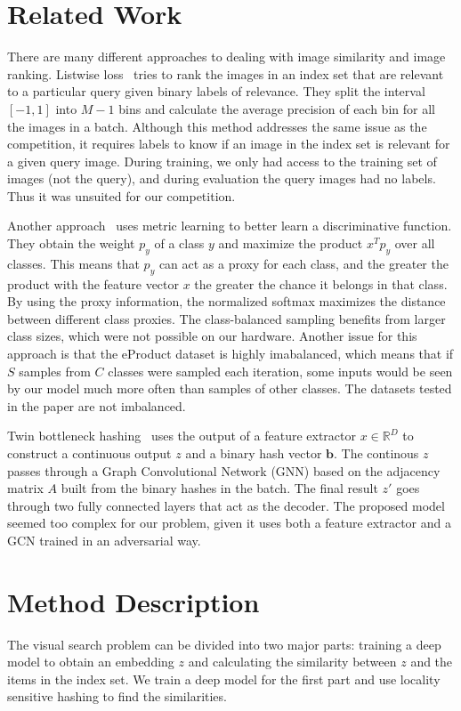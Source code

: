 \documentclass[conference]{IEEEtran}
\begin{document}
\section{Related Work}
There are many different approaches to dealing with image similarity and image 
ranking.
Listwise loss~\cite{revaud2019learning} tries to rank the images in an index set that are 
relevant to a particular query given binary labels of relevance. 
They split the interval $[-1, 1]$ into $M-1$ bins and calculate the average precision
of each bin for all the images in a batch.
Although this method addresses the same issue as the competition, it requires labels to know
if an image in the index set is relevant for a given query image.
During training, we only had access to the training set of images (not the query), and during 
evaluation the query images had no labels.
Thus it was unsuited for our competition.

Another approach~\cite{zhai2018classification} uses metric learning to better learn a discriminative 
function.
They obtain the weight $p_y$ of a class $y$ and maximize the product $x^T p_y$ over all classes.
This means that $p_y$ can act as a proxy for each class, and the greater the product with the feature
vector $x$ the greater the chance it belongs in that class.
By using the proxy information, the normalized softmax maximizes the distance between different class
proxies.
The class-balanced sampling benefits from larger class sizes, which were not possible on our hardware.
Another issue for this approach is that the eProduct dataset is highly imabalanced, which means that 
if $S$ samples from $C$ classes were sampled each iteration, some inputs would be seen by our model
much more often than samples of other classes.
The datasets tested in the paper are not imbalanced.

Twin bottleneck hashing~\cite{shen2020auto} uses the output of a feature extractor $x\in\mathbb{R}^D$
to construct a continuous output $z$ and a binary hash vector $\boldsymbol{b}$.
The continous $z$ passes through a Graph Convolutional Network (GNN) based on the adjacency
matrix $A$ built from the binary hashes in the batch.
The final result $z'$ goes through two fully connected layers that act as the decoder.
The proposed model seemed too complex for our problem, given it uses both a feature extractor and a GCN
trained in an adversarial way.

\section{Method Description}
The visual search problem can be divided into two major parts: training a deep model
to obtain an embedding $z$ and calculating the similarity between $z$ and the items in the index set.
We train a deep model for the first part and use locality sensitive hashing to find the 
similarities.
\end{document}
